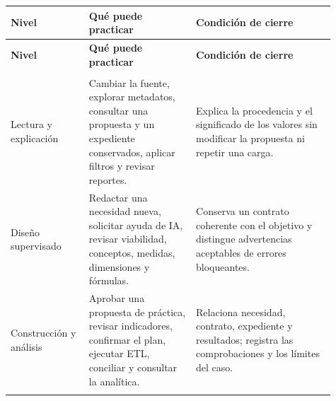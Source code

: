 \begingroup
\fontsize{10}{12.5}\selectfont
\setlength{\tabcolsep}{5pt}
\renewcommand{\arraystretch}{1.15}
\begin{longtable}{@{}>{\RaggedRight\arraybackslash}p{0.22\linewidth}>{\RaggedRight\arraybackslash}p{0.3\linewidth}>{\RaggedRight\arraybackslash}p{0.39\linewidth}@{}}
\toprule
\textbf{Nivel} & \textbf{Qué puede practicar} & \textbf{Condición de cierre} \\
\midrule
\endfirsthead
\toprule
\textbf{Nivel} & \textbf{Qué puede practicar} & \textbf{Condición de cierre} \\
\midrule
\endhead
\midrule
\multicolumn{3}{r}{\footnotesize Continúa en la página siguiente}\\
\endfoot
\bottomrule
\endlastfoot
Lectura y explicación & Cambiar la fuente, explorar metadatos, consultar una propuesta y un expediente conservados, aplicar filtros y revisar reportes. & Explica la procedencia y el significado de los valores sin modificar la propuesta ni repetir una carga. \\
\addlinespace[3pt]
Diseño supervisado & Redactar una necesidad nueva, solicitar ayuda de IA, revisar viabilidad, conceptos, medidas, dimensiones y fórmulas. & Conserva un contrato coherente con el objetivo y distingue advertencias aceptables de errores bloqueantes. \\
\addlinespace[3pt]
Construcción y análisis & Aprobar una propuesta de práctica, revisar indicadores, confirmar el plan, ejecutar ETL, conciliar y consultar la analítica. & Relaciona necesidad, contrato, expediente y resultados; registra las comprobaciones y los límites del caso. \\
\addlinespace[3pt]
\end{longtable}
\endgroup

